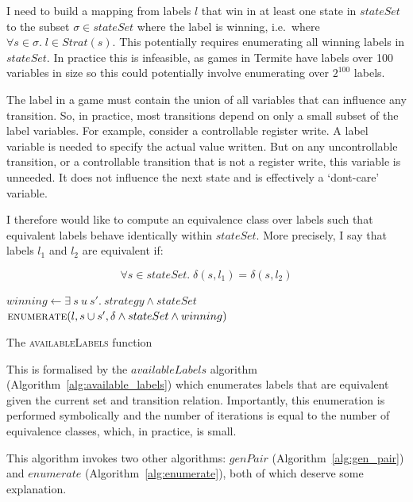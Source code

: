 I need to build a mapping from labels $l$ that win in at least one state in $stateSet$ to the subset $\sigma \in stateSet$ where the label is winning, i.e.\ where $\forall s \in \sigma . \; l \in Strat(s)$. This potentially requires enumerating all winning labels in $stateSet$. In practice this is infeasible, as games in Termite have labels over 100 variables in size so this could potentially involve enumerating over $2^{100}$ labels. 

The label in a game must contain the union of all variables that can influence any transition. So, in practice, most transitions depend on only a small subset of the label variables. For example, consider a controllable register write. A label variable is needed to specify the actual value written. But on any uncontrollable transition, or a controllable transition that is not a register write, this variable is unneeded. It does not influence the next state and is effectively a `dont-care' variable.

I therefore would like to compute an equivalence class over labels such that equivalent labels behave identically within $stateSet$. More precisely, I say that labels $l_1$ and $l_2$ are equivalent if:

\begin{equation}
    \forall s \in stateSet. \; \delta(s, l_1) = \delta(s, l_2)
\end{equation}

\begin{algorithm}
\begin{algorithmic}

    \State $winning \gets \exists \: s \: u \: s'. \: strategy \land stateSet$
    \State\Return$\Call{enumerate}{l, s \cup s', \delta \land stateSet \land winning}$
\EndFunction

\end{algorithmic}
\caption{The \textsc{availableLabels} function}
\label{alg:available_labels}
\end{algorithm}

This is formalised by the $availableLabels$ algorithm (Algorithm~\ref{alg:available_labels}) which enumerates labels that are equivalent given the current set and transition relation. Importantly, this enumeration is performed symbolically and the number of iterations is equal to the number of equivalence classes, which, in practice, is small.

This algorithm invokes two other algorithms: $genPair$ (Algorithm~\ref{alg:gen_pair}) and $enumerate$ (Algorithm~\ref{alg:enumerate}), both of which deserve some explanation. 

